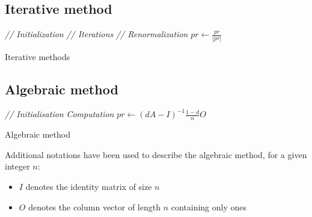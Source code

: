 \documentclass[pdftex,12pt,a4paper]{article}
\begin{document}
\subsection{Iterative method}
\IncMargin{1em}
\begin{algorithm}[H]
\BlankLine
\Indm
{}
\Indp
\BlankLine
\emph{// Initialization}\;
\emph{// Iterations}\;
\emph{// Renormalization}\;
$pr\leftarrow\frac{pr}{|pr|}$\;
\BlankLine
\caption{Iterative methods}\label{algo_iterative_method}
\end{algorithm}
\DecMargin{1em}

\subsection{Algebraic method}

\IncMargin{1em}
\begin{algorithm}[H]
\BlankLine
\Indm
{}
\Indp
\BlankLine
\emph{// Initialisation}\;
\emph{Computation}\;
$pr\leftarrow \left(dA-I\right)^{-1}\frac{1-d}{n}O$
\BlankLine
\caption{Algebraic method}\label{algebraic_method}
\end{algorithm}
\DecMargin{1em}

Additional notations have been used to describe the algebraic method, for a given integer $n$:
\begin{itemize}
\item $I$ denotes the identity matrix of size $n$
\item $O$ denotes the column vector of length $n$ containing only ones
\end{itemize}
\end{document}
